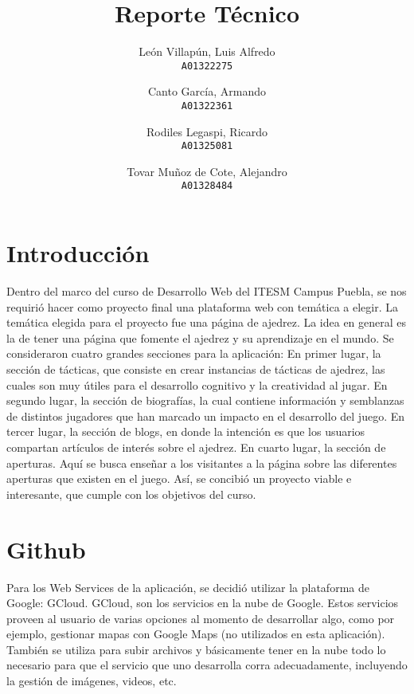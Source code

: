 \documentclass{article}
\title{Reporte Técnico}
\author{
  León Villapún, Luis Alfredo\\
  \texttt{A01322275}
  \and
  Canto García, Armando\\
  \texttt{A01322361}
  \and
  Rodiles Legaspi, Ricardo\\
  \texttt{A01325081}
  \and
  Tovar Muñoz de Cote, Alejandro\\
  \texttt{A01328484}
}
\begin{document}
	\maketitle
	\newpage
	
	\tableofcontents
	\newpage
	
	\section{Introducción}
	Dentro del marco del curso de Desarrollo Web del ITESM Campus Puebla, se nos requirió hacer como proyecto final una plataforma web con temática a elegir.
	\linebreak
	La temática elegida para el proyecto fue una página de ajedrez. La idea en general es la de tener una página que fomente el ajedrez y su aprendizaje en el mundo.
	\linebreak
	Se consideraron cuatro grandes secciones para la aplicación: 
	\linebreak
	En primer lugar, la sección de tácticas, que consiste en crear instancias de tácticas de ajedrez, las cuales son muy útiles para el desarrollo cognitivo y la creatividad al jugar.
	\linebreak
	En segundo lugar, la sección de biografías, la cual contiene información y semblanzas de distintos jugadores que han marcado un impacto en el desarrollo del juego.
	\linebreak
	En tercer lugar, la sección de blogs, en donde la intención es que los usuarios compartan artículos de interés sobre el ajedrez.
	\linebreak
	En cuarto lugar, la sección de aperturas. Aquí se busca enseñar a los visitantes a la página sobre las diferentes aperturas que existen en el juego.
	\linebreak
	Así, se concibió un proyecto viable e interesante, que cumple con los objetivos del curso.
			
	
	\section{Github}
	
	Para los Web Services de la aplicación, se decidió utilizar la plataforma de Google: GCloud.
	\linebreak
	GCloud, son los servicios en la nube de Google. Estos servicios proveen al usuario de varias opciones al momento de desarrollar algo, como por ejemplo, gestionar mapas con Google Maps (no utilizados en esta aplicación). También se utiliza para subir archivos y básicamente tener en la nube todo lo necesario para que el servicio que uno desarrolla corra adecuadamente, incluyendo la gestión de imágenes, videos, etc.
	
\end{document}
